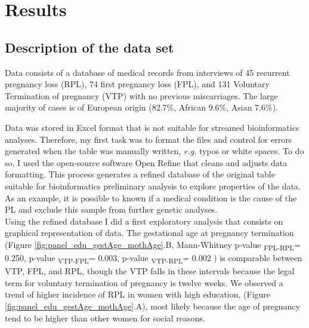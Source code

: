 
\chapter{Results} %

\label{Chapter3} %


\newcommand{\keyword}[1]{\textbf{#1}}
\newcommand{\tabhead}[1]{\textbf{#1}}
\newcommand{\code}[1]{\texttt{#1}}
\newcommand{\file}[1]{\texttt{\bfseries#1}}
\newcommand{\option}[1]{\texttt{\itshape#1}}





\section{Description of the data set}
Data consists of a database of medical records from interviews of 45 recurrent pregnancy loss (RPL), 74 first pregnancy loss (FPL), and 131 Voluntary Termination of pregnancy (VTP) with no previous miscarriages. The large majority of cases is of European origin (82.7\%, African 9.6\%, Asian 7.6\%).\newline

Data was stored in Excel format that is not suitable for streamed bioinformatics analyses. Therefore, my first task was to format the files and control for errors generated when the table was manually written, \textit{e.g.} typos or white spaces. To do so, I used the open-source software Open Refine \cite{openRefine} that cleans and adjusts data formatting. This process generates a refined database of the original table suitable for bioinformatics preliminary analysis to explore properties of the data. As an example, it is possible to known  if a medical condition is the cause of the PL and exclude this sample from further genetic analyses.\\

Using the refined database I did a first exploratory analysis that consists on graphical representation of data.  The gestational age at pregnancy termination (Figure \ref{fig:panel_edu_gestAge_mothAge}.B, Mann-Whitney p-value\textsubscript{ FPL-RPL}= 0.250, p-value\textsubscript{ VTP-FPL}= 0.003, p-value\textsubscript{ VTP-RPL}= 0.002 ) is comparable between VTP, FPL, and RPL, though the VTP falls in these intervals because the legal term for voluntary termination of pregnancy is twelve weeks. We observed a trend of higher incidence of RPL in women with high education, (Figure \ref{fig:panel_edu_gestAge_mothAge}.A), most likely because the age of pregnancy tend to be higher than other women for social reasons. 

